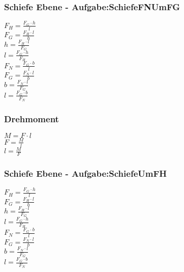 \subsubsection{Schiefe Ebene - Aufgabe:SchiefeFNUmFG} 
\begin{minipage}{0.45\textwidth} 
$ F_{H}  = \frac{F_{G} \cdot h}{ l} $\\ 
$ F_{G}  = \frac{F_{H} \cdot l}{ h} $\\ 
$ h = \frac{F_{H} \cdot l}{ F_{G} } $\\ 
$ l = \frac{F_{G} \cdot h}{ F_{H} } $\\ 
$ F_{N}  = \frac{F_{G} \cdot b}{ l} $\\ 
$ F_{G}  = \frac{F_{N} \cdot l}{ b} $\\ 
$ b = \frac{F_{N} \cdot l}{ F_{G} } $\\ 
$ l = \frac{F_{G} \cdot b}{ F_{N} } $\\ 
\end{minipage} 
\begin{minipage}{0.45\textwidth} 
 
\end{minipage} 
\subsubsection{Drehmoment} 
\begin{minipage}{0.45\textwidth} 
$ M = F\cdot l $\\ 
$ F = \frac{M}{l} $\\ 
$ l = \frac{M}{F} $\\ 
\end{minipage} 
\begin{minipage}{0.45\textwidth} 
 
\end{minipage} 
\subsubsection{Schiefe Ebene - Aufgabe:SchiefeUmFH} 
\begin{minipage}{0.45\textwidth} 
$ F_{H}  = \frac{F_{G} \cdot h}{ l} $\\ 
$ F_{G}  = \frac{F_{H} \cdot l}{ h} $\\ 
$ h = \frac{F_{H} \cdot l}{ F_{G} } $\\ 
$ l = \frac{F_{G} \cdot h}{ F_{H} } $\\ 
$ F_{N}  = \frac{F_{G} \cdot b}{ l} $\\ 
$ F_{G}  = \frac{F_{N} \cdot l}{ b} $\\ 
$ b = \frac{F_{N} \cdot l}{ F_{G} } $\\ 
$ l = \frac{F_{G} \cdot b}{ F_{N} } $\\ 
\end{minipage} 
\begin{minipage}{0.45\textwidth} 
 
\end{minipage} 
